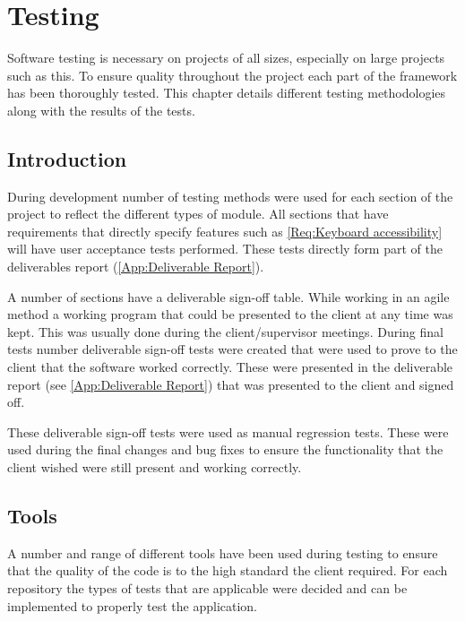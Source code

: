 
\chapter{Testing} \label{Chapter: Testing}

\begin{preamble}
Software testing is necessary on projects of all sizes, especially on large projects such as this. To ensure quality throughout the project each part of the framework has been thoroughly tested. This chapter details different testing methodologies along with the results of the tests.
\end{preamble}

\section{Introduction}

During development number of testing methods were used for each section of the project to reflect the different types of module. All sections that have requirements that directly specify features such as \cref{Req:Keyboard accessibility} will have user acceptance tests performed. These tests directly form part of the deliverables report (\cref{App:Deliverable Report}).

A number of sections have a deliverable sign-off table. While working in an agile method a working program that could be presented to the client at any time was kept. This was usually done during the client/supervisor meetings. During final tests number deliverable sign-off tests were created that were used to prove to the client that the software worked correctly. These were presented in the deliverable report (see \cref{App:Deliverable Report}) that was presented to the client and signed off.

These deliverable sign-off tests were used as manual regression tests. These were used during the final changes and bug fixes to ensure the functionality that the client wished were still present and working correctly.

\section{Tools}

A number and range of different tools have been used during testing to ensure that the quality of the code is to the high standard the client required. For each repository the types of tests that are applicable were decided and can be implemented to properly test the application.

